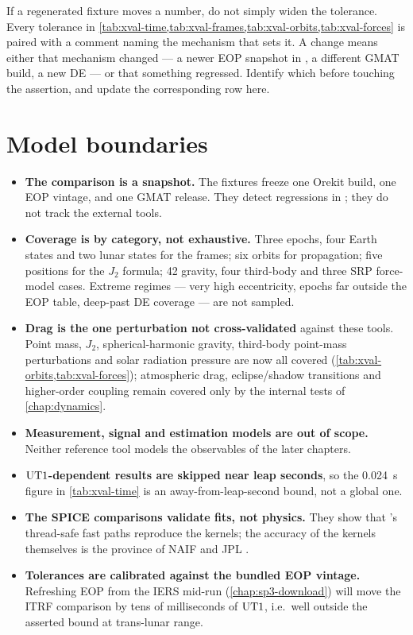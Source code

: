 \begin{lupntwarning}
If a regenerated fixture moves a number, do not simply widen the tolerance.
Every tolerance in
\cref{tab:xval-time,tab:xval-frames,tab:xval-orbits,tab:xval-forces} is
paired with a comment naming the mechanism that sets it. A change means either
that mechanism changed --- a newer EOP snapshot in , a
different GMAT build, a new DE --- or that something regressed. Identify which
before touching the assertion, and update the corresponding row here.
\end{lupntwarning}

\section{Model boundaries}
\label{sec:xval-boundaries}

\begin{itemize}[leftmargin=1.4em]
  \item \textbf{The comparison is a snapshot.} The fixtures freeze one Orekit
    build, one  EOP vintage, and one GMAT release. They
    detect regressions in \lupnt{}; they do not track the external tools.
  \item \textbf{Coverage is by category, not exhaustive.} Three epochs, four
    Earth states and two lunar states for the frames; six orbits for
    propagation; five positions for the $J_2$ formula; 42 gravity, four
    third-body and three SRP force-model cases. Extreme regimes --- very high
    eccentricity, epochs far outside the EOP table, deep-past DE coverage ---
    are not sampled.
  \item \textbf{Drag is the one perturbation not cross-validated} against these
    tools. Point mass, $J_2$, spherical-harmonic gravity, third-body
    point-mass perturbations and solar radiation pressure are now all covered
    (\cref{tab:xval-orbits,tab:xval-forces}); atmospheric drag, eclipse/shadow
    transitions and higher-order coupling remain covered only by the internal
    tests of \cref{chap:dynamics}.
  \item \textbf{Measurement, signal and estimation models are out of scope.}
    Neither reference tool models the observables of the later chapters.
  \item \textbf{$\mathrm{UT1}$-dependent results are skipped near leap seconds},
    so the \SI{0.024}{\second} figure in \cref{tab:xval-time} is an
    away-from-leap-second bound, not a global one.
  \item \textbf{The SPICE comparisons validate fits, not physics.} They show
    that \lupnt{}'s thread-safe fast paths reproduce the kernels; the accuracy
    of the kernels themselves is the province of NAIF and JPL
    \citep{acton1996spice,park2021de440}.
  \item \textbf{Tolerances are calibrated against the bundled EOP vintage.}
    Refreshing EOP from the IERS mid-run (\cref{chap:sp3-download}) will move
    the ITRF comparison by tens of milliseconds of $\mathrm{UT1}$, i.e.\ well
    outside the asserted bound at trans-lunar range.
\end{itemize}
